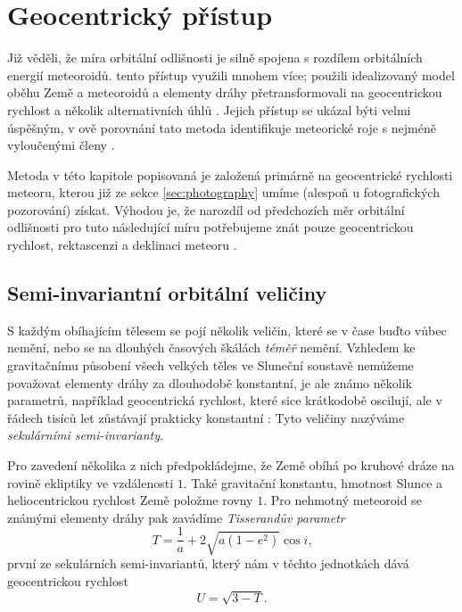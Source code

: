 \chapter{Geocentrický přístup}%
Již \citeauthor{dsh} věděli, že míra orbitální odlišnosti je silně spojena s rozdílem orbitálních energií meteoroidů. \citeauthor{newapproach} tento přístup využili mnohem více; použili idealizovaný model oběhu Země a meteoroidů a elementy dráhy přetransformovali na geocentrickou rychlost a několik alternativních úhlů \cite{newapproach}. Jejich přístup se ukázal býti velmi úspěšným, v \citeauthor{galligan}ově porovnání tato metoda identifikuje meteorické roje s nejméně vyloučenými členy \cite{galligan}.

Metoda v této kapitole popisovaná je založená primárně na geocentrické rychlosti meteoru, kterou již ze sekce \ref{sec:photography} umíme (alespoň u fotografických pozorování) získat. Výhodou je, že narozdíl od předchozích měr orbitální odlišnosti pro tuto následující míru potřebujeme znát pouze geocentrickou rychlost, rektascenzi a deklinaci meteoru \cite{newapproach}. 

\section{Semi-invariantní orbitální veličiny}%
S každým obíhajícím tělesem se pojí několik veličin, které se v čase buďto vůbec nemění, nebo se na dlouhých časových škálách \textit{téměř} nemění. Vzhledem ke gravitačnímu působení všech velkých těles ve Sluneční soustavě nemůžeme považovat elementy dráhy za dlouhodobě konstantní, je ale známo několik parametrů, například geocentrická rychlost, které sice krátkodobě oscilují, ale v řádech tisíců let zůstávají prakticky konstantní \cite{newapproach}: Tyto veličiny nazýváme \textit{sekulárními semi-invarianty}.

\medskip

Pro zavedení několika z nich předpokládejme, že Země obíhá po kruhové dráze na rovině ekliptiky ve vzdálenosti $1$. Také gravitační konstantu, hmotnost Slunce a heliocentrickou rychlost Země položme rovny $1$. Pro nehmotný meteoroid se známými elementy dráhy pak zavádíme \textit{Tisserandův parametr} \cite{newapproach}
\begin{equation}
    T=\frac{1}{a}+2\sqrt{a(1-e^2)}\cos{i} \text{,}
\end{equation}
první ze sekulárních semi-invariantů, který nám v těchto jednotkách dává geocentrickou rychlost \cite{newapproach}
\begin{equation}
    U=\sqrt{3-T}\text{.}
\end{equation}

